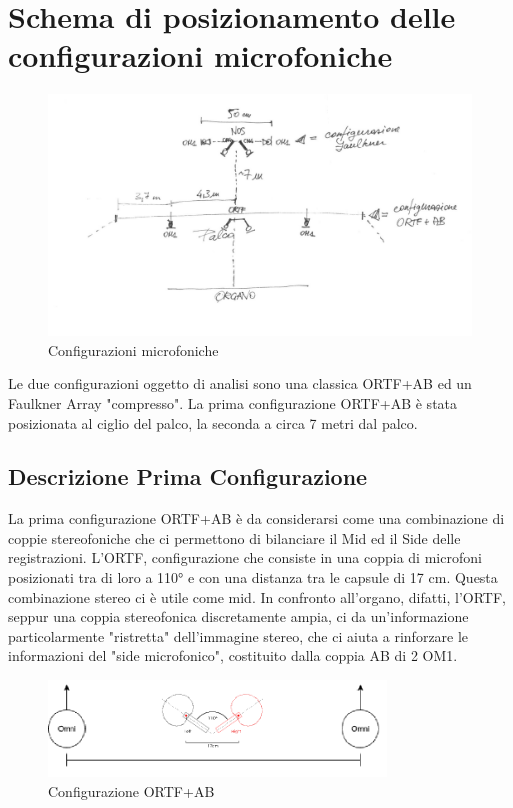 \documentclass{article}
\begin{document}
\section{Schema di posizionamento delle configurazioni microfoniche}
    \begin{figure}[H]
        \centering
        \includegraphics[width=1\textwidth]{images/schema.jpg}
        \caption{\label{fig8}Configurazioni microfoniche}
    \end{figure}
    
    Le due configurazioni oggetto di analisi sono una classica ORTF+AB ed un Faulkner Array "compresso".
    La prima configurazione ORTF+AB è stata posizionata al ciglio del palco, la seconda a circa 7 metri dal palco.
    
    \subsection{Descrizione Prima Configurazione}
        La prima configurazione ORTF+AB è da considerarsi come una combinazione di coppie stereofoniche che ci permettono di bilanciare il Mid ed il Side delle registrazioni. L'ORTF, configurazione che consiste in una coppia di microfoni posizionati tra di loro a 110° e con una distanza tra le capsule di 17 cm. Questa combinazione stereo ci è utile come mid. In confronto all'organo, difatti, l'ORTF, seppur una coppia stereofonica discretamente ampia, ci da un'informazione particolarmente "ristretta" dell'immagine stereo, che ci aiuta a rinforzare le informazioni del "side microfonico", costituito dalla coppia AB di 2 OM1.
    
        \begin{figure}[H]
            \centering
            \includegraphics[width=0.8\textwidth]{images/ortfab.png}
            \caption{\label{fig9}Configurazione ORTF+AB}
        \end{figure}
    
\end{document}
